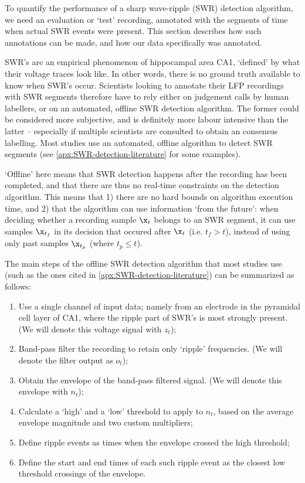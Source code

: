 \label{sec:offline}

To quantify the performance of a sharp wave-ripple (SWR) detection algorithm, we need an evaluation or `test' recording, annotated with the segments of time when actual SWR events were present. This section describes how such annotations can be made, and how our data specifically was annotated.

SWR's are an empirical phenomenon of hippocampal area CA1, `defined' by what their voltage traces look like. In other words, there is no ground truth available to know when SWR's occur. Scientists looking to annotate their LFP recordings with SWR segments therefore have to rely either on judgement calls by human labellers, or on an automated, offline SWR detection algorithm. The former could be considered more subjective, and is definitely more labour intensive than the latter -- especially if multiple scientists are consulted to obtain an consensus labelling. Most studies use an automated, offline algorithm to detect SWR segments (see \cref{apx:SWR-detection-literature} for some examples).

`Offline' here means that SWR detection happens after the recording has been completed, and that there are thus no real-time constraints on the detection algorithm. This means that 1) there are no hard bounds on algorithm execution time, and 2) that the algorithm can use information `from the future': when deciding whether a recording sample $\x_t$ belongs to an SWR segment, it can use samples $\x_{t_f}$ in its decision that occured after $\x_t$ (i.e. $t_f > t$), instead of using only past samples $\x_{t_p}$ (where $t_p \leq t$).

The main steps of the offline SWR detection algorithm that most studies use (such as the ones cited in \cref{apx:SWR-detection-literature}) can be summarized as follows:
\begin{enumerate}
\item Use a single channel of input data; namely from an electrode in the pyramidal cell layer of CA1, where the ripple part of SWR's is most strongly present. (We will denote this voltage signal with $z_t$);
\item Band-pass filter the recording to retain only `ripple' frequencies. (We will denote the filter output as $o_t$);
\item Obtain the envelope of the band-pass filtered signal. (We will denote this envelope with $n_t$);
\item Calculate a `high' and a `low' threshold to apply to $n_t$, based on the average envelope magnitude and two custom multipliers;
\item Define ripple events as times when the envelope crossed the high threshold;
\item Define the start and end times of each such ripple event as the closest low threshold crossings of the envelope.
\end{enumerate}

